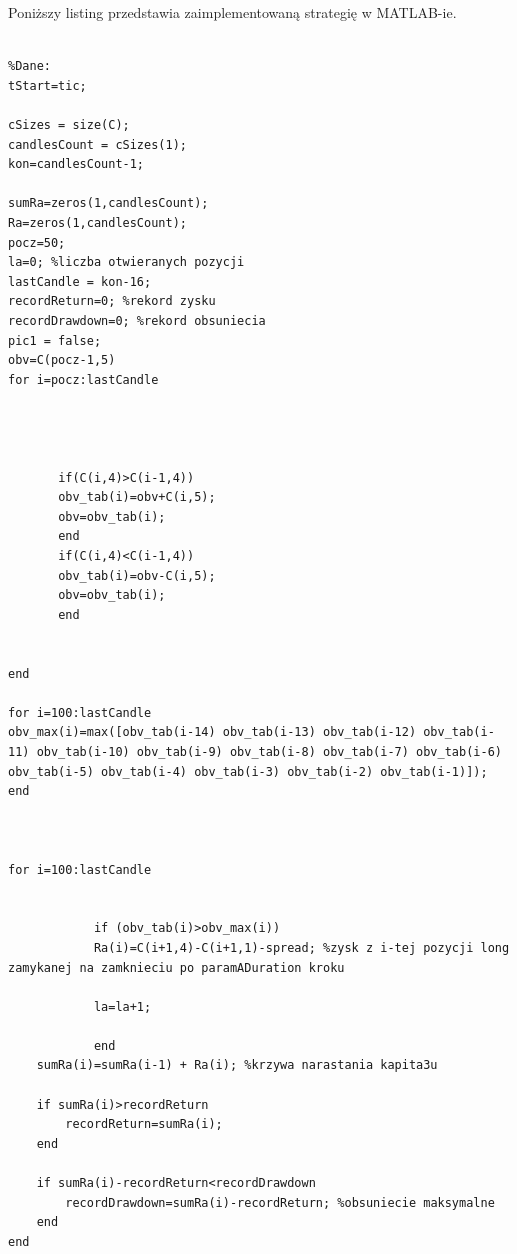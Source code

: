 \noindent Poniższy listing przedstawia zaimplementowaną strategię w MATLAB-ie.
\begin{scriptsize}
\begin{lstlisting}

%Dane:
tStart=tic;

cSizes = size(C);
candlesCount = cSizes(1);
kon=candlesCount-1;

sumRa=zeros(1,candlesCount);
Ra=zeros(1,candlesCount);
pocz=50;
la=0; %liczba otwieranych pozycji
lastCandle = kon-16;
recordReturn=0; %rekord zysku
recordDrawdown=0; %rekord obsuniecia
pic1 = false;
obv=C(pocz-1,5)
for i=pocz:lastCandle
    
   
    
    
       if(C(i,4)>C(i-1,4))
       obv_tab(i)=obv+C(i,5);
       obv=obv_tab(i);
       end
       if(C(i,4)<C(i-1,4))
       obv_tab(i)=obv-C(i,5);
       obv=obv_tab(i);
       end
       
        
end

for i=100:lastCandle
obv_max(i)=max([obv_tab(i-14) obv_tab(i-13) obv_tab(i-12) obv_tab(i-11) obv_tab(i-10) obv_tab(i-9) obv_tab(i-8) obv_tab(i-7) obv_tab(i-6) obv_tab(i-5) obv_tab(i-4) obv_tab(i-3) obv_tab(i-2) obv_tab(i-1)]);
end



for i=100:lastCandle
    
    
            if (obv_tab(i)>obv_max(i))
            Ra(i)=C(i+1,4)-C(i+1,1)-spread; %zysk z i-tej pozycji long zamykanej na zamknieciu po paramADuration kroku
            
            la=la+1;
      
            end
    sumRa(i)=sumRa(i-1) + Ra(i); %krzywa narastania kapita3u
    
    if sumRa(i)>recordReturn
        recordReturn=sumRa(i);
    end
    
    if sumRa(i)-recordReturn<recordDrawdown
        recordDrawdown=sumRa(i)-recordReturn; %obsuniecie maksymalne
    end
end


\end{lstlisting}
\end{scriptsize}


